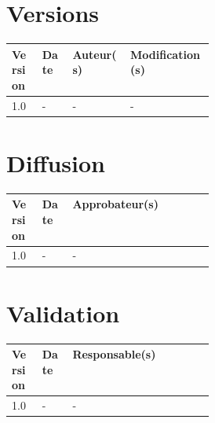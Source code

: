 \documentclass[11pt,fleqn]{book} %
\begin{document}
\section*{Versions}
\begin{tabularx}{\linewidth}{m{0.15\linewidth} m{0.15\linewidth} X X}
	\toprule
	Version & Date & Auteur(s) & Modification(s) \\
	\midrule
	1.0 & - & - & - \\
	\bottomrule
\end{tabularx}

\section*{Diffusion}
\begin{tabularx}{\linewidth}{m{0.15\linewidth} m{0.15\linewidth} X}
	\toprule
	Version & Date & Approbateur(s) \\
	\midrule
	1.0 & - & - \\
	\bottomrule
\end{tabularx}

\section*{Validation}
\begin{tabularx}{\linewidth}{m{0.15\linewidth} m{0.15\linewidth} X}
	\toprule
	Version & Date & Responsable(s) \\
	\midrule
	1.0 & - & - \\
	\bottomrule
\end{tabularx}

\vfill



\pagestyle{empty} %

\tableofcontents %


\pagestyle{fancy} %










\end{document}

